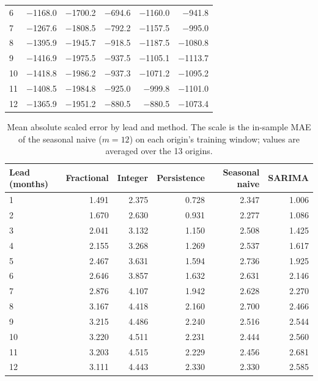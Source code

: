 \documentclass[pdflatex,sn-mathphys-ay,lineno]{sn-jnl}
\begin{document}
\begin{appendices}
\begin{table}[htbp]
\begin{tabular}{@{}lrrrrr@{}}
6 & $-$1168.0 & $-$1700.2 & $-$694.6 & $-$1160.0 & $-$941.8 \\
7 & $-$1267.6 & $-$1808.5 & $-$792.2 & $-$1157.5 & $-$995.0 \\
8 & $-$1395.9 & $-$1945.7 & $-$918.5 & $-$1187.5 & $-$1080.8 \\
9 & $-$1416.9 & $-$1975.5 & $-$937.5 & $-$1105.1 & $-$1113.7 \\
10 & $-$1418.8 & $-$1986.2 & $-$937.3 & $-$1071.2 & $-$1095.2 \\
11 & $-$1408.5 & $-$1984.8 & $-$925.0 & $-$999.8 & $-$1101.0 \\
12 & $-$1365.9 & $-$1951.2 & $-$880.5 & $-$880.5 & $-$1073.4 \\
\bottomrule
\end{tabular}
\endgroup
\end{table}
\begin{table}[htbp]
\centering
\small
\caption{Mean absolute scaled error by lead and method. The scale is the in-sample MAE of the seasonal naive ($m=12$) on each origin's training window; values are averaged over the 13 origins.}
\label{tab:mase_h}
\begingroup\setlength{\tabcolsep}{6pt}
\begin{tabular}{@{}lrrrrr@{}}
\toprule
Lead (months) & Fractional & Integer & Persistence & Seasonal naive & SARIMA \\
\midrule
1 & 1.491 & 2.375 & 0.728 & 2.347 & 1.006 \\
2 & 1.670 & 2.630 & 0.931 & 2.277 & 1.086 \\
3 & 2.041 & 3.132 & 1.150 & 2.508 & 1.425 \\
4 & 2.155 & 3.268 & 1.269 & 2.537 & 1.617 \\
5 & 2.467 & 3.631 & 1.594 & 2.736 & 1.925 \\
6 & 2.646 & 3.857 & 1.632 & 2.631 & 2.146 \\
7 & 2.876 & 4.107 & 1.942 & 2.628 & 2.270 \\
8 & 3.167 & 4.418 & 2.160 & 2.700 & 2.466 \\
9 & 3.215 & 4.486 & 2.240 & 2.516 & 2.544 \\
10 & 3.220 & 4.511 & 2.231 & 2.444 & 2.560 \\
11 & 3.203 & 4.515 & 2.229 & 2.456 & 2.681 \\
12 & 3.111 & 4.443 & 2.330 & 2.330 & 2.585 \\
\bottomrule
\end{tabular}
\endgroup
\end{table}
\begin{table}[htbp]

\end{table}
\end{appendices}
\end{document}
